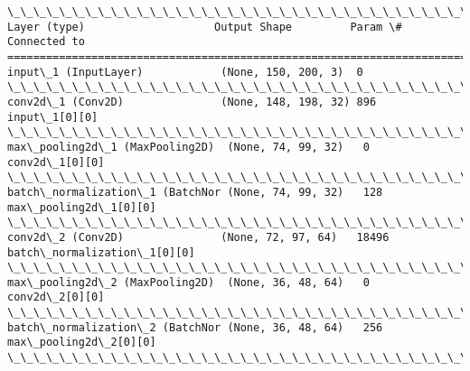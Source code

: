 \documentclass[11pt]{article}
\begin{document}
    \begin{Verbatim}[commandchars=\\\{\}]
\_\_\_\_\_\_\_\_\_\_\_\_\_\_\_\_\_\_\_\_\_\_\_\_\_\_\_\_\_\_\_\_\_\_\_\_\_\_\_\_\_\_\_\_\_\_\_\_\_\_\_\_\_\_\_\_\_\_\_\_\_\_\_\_\_\_\_\_\_\_\_\_\_\_\_\_\_\_\_\_\_\_\_\_\_\_\_\_\_\_\_\_\_\_\_\_\_\_
Layer (type)                    Output Shape         Param \#     Connected to                     
==================================================================================================
input\_1 (InputLayer)            (None, 150, 200, 3)  0                                            
\_\_\_\_\_\_\_\_\_\_\_\_\_\_\_\_\_\_\_\_\_\_\_\_\_\_\_\_\_\_\_\_\_\_\_\_\_\_\_\_\_\_\_\_\_\_\_\_\_\_\_\_\_\_\_\_\_\_\_\_\_\_\_\_\_\_\_\_\_\_\_\_\_\_\_\_\_\_\_\_\_\_\_\_\_\_\_\_\_\_\_\_\_\_\_\_\_\_
conv2d\_1 (Conv2D)               (None, 148, 198, 32) 896         input\_1[0][0]                    
\_\_\_\_\_\_\_\_\_\_\_\_\_\_\_\_\_\_\_\_\_\_\_\_\_\_\_\_\_\_\_\_\_\_\_\_\_\_\_\_\_\_\_\_\_\_\_\_\_\_\_\_\_\_\_\_\_\_\_\_\_\_\_\_\_\_\_\_\_\_\_\_\_\_\_\_\_\_\_\_\_\_\_\_\_\_\_\_\_\_\_\_\_\_\_\_\_\_
max\_pooling2d\_1 (MaxPooling2D)  (None, 74, 99, 32)   0           conv2d\_1[0][0]                   
\_\_\_\_\_\_\_\_\_\_\_\_\_\_\_\_\_\_\_\_\_\_\_\_\_\_\_\_\_\_\_\_\_\_\_\_\_\_\_\_\_\_\_\_\_\_\_\_\_\_\_\_\_\_\_\_\_\_\_\_\_\_\_\_\_\_\_\_\_\_\_\_\_\_\_\_\_\_\_\_\_\_\_\_\_\_\_\_\_\_\_\_\_\_\_\_\_\_
batch\_normalization\_1 (BatchNor (None, 74, 99, 32)   128         max\_pooling2d\_1[0][0]            
\_\_\_\_\_\_\_\_\_\_\_\_\_\_\_\_\_\_\_\_\_\_\_\_\_\_\_\_\_\_\_\_\_\_\_\_\_\_\_\_\_\_\_\_\_\_\_\_\_\_\_\_\_\_\_\_\_\_\_\_\_\_\_\_\_\_\_\_\_\_\_\_\_\_\_\_\_\_\_\_\_\_\_\_\_\_\_\_\_\_\_\_\_\_\_\_\_\_
conv2d\_2 (Conv2D)               (None, 72, 97, 64)   18496       batch\_normalization\_1[0][0]      
\_\_\_\_\_\_\_\_\_\_\_\_\_\_\_\_\_\_\_\_\_\_\_\_\_\_\_\_\_\_\_\_\_\_\_\_\_\_\_\_\_\_\_\_\_\_\_\_\_\_\_\_\_\_\_\_\_\_\_\_\_\_\_\_\_\_\_\_\_\_\_\_\_\_\_\_\_\_\_\_\_\_\_\_\_\_\_\_\_\_\_\_\_\_\_\_\_\_
max\_pooling2d\_2 (MaxPooling2D)  (None, 36, 48, 64)   0           conv2d\_2[0][0]                   
\_\_\_\_\_\_\_\_\_\_\_\_\_\_\_\_\_\_\_\_\_\_\_\_\_\_\_\_\_\_\_\_\_\_\_\_\_\_\_\_\_\_\_\_\_\_\_\_\_\_\_\_\_\_\_\_\_\_\_\_\_\_\_\_\_\_\_\_\_\_\_\_\_\_\_\_\_\_\_\_\_\_\_\_\_\_\_\_\_\_\_\_\_\_\_\_\_\_
batch\_normalization\_2 (BatchNor (None, 36, 48, 64)   256         max\_pooling2d\_2[0][0]            
\_\_\_\_\_\_\_\_\_\_\_\_\_\_\_\_\_\_\_\_\_\_\_\_\_\_\_\_\_\_\_\_\_\_\_\_\_\_\_\_\_\_\_\_\_\_\_\_\_\_\_\_\_\_\_\_\_\_\_\_\_\_\_\_\_\_\_\_\_\_\_\_\_\_\_\_\_\_\_\_\_\_\_\_\_\_\_\_\_\_\_\_\_\_\_\_\_\_

\end{Verbatim}
\end{document}
